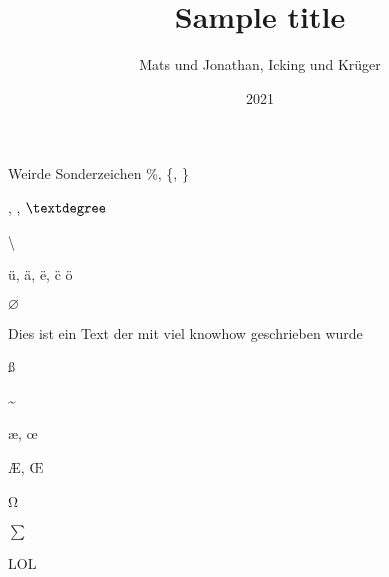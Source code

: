 \documentclass{beamer}
\title{Sample title}
\author{Mats und Jonathan, Icking und Krüger}
\institute{Overleaf}
\date{2021}
\begin{document}
\frame{\titlepage}

\begin{frame}{Weirde Sonderzeichen}
\%, \{, \}

\alpha, \beta, $\textdegree$

\kappa

\textbackslash

\"u, \"a, \"e, \"c \"o

$\diameter$

Dies ist ein Text der mit viel knowhow geschrieben wurde

\ss

\textasciitilde

\ae, \oe

\AE, \OE

\Omega

\si{\ohm}

$\sum$
\end{frame}
\begin{frame}{LOL}
    \sum
\end{frame}
\end{document}
